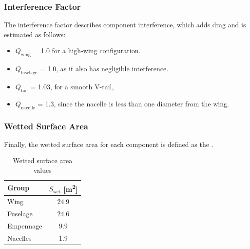 \subsubsection{Interference Factor}
The interference factor describes component interference, which adds drag and is estimated as follows:
\begin{itemize}
    \item $Q_\text{wing}$ = 1.0 for a high-wing configuration.
    \item $Q_\text{fuselage}$ = 1.0, as it also has negligible interference.
    \item $Q_\text{tail}$ = 1.03, for a smooth V-tail,
    \item $Q_\text{nacelle}$ = 1.3, since the nacelle is less than one diameter from the wing.
\end{itemize}
 
\subsubsection{Wetted Surface Area}
Finally, the wetted surface area for each component is defined as the .

\begin{table}[H]
    \centering
    \caption{Wetted surface area values}
    \label{tab:Wetted Surface Area}
    \begin{tabular}{l|S[table-format=2.1]}
        \toprule
        \textbf{Group}       & \textbf{$S_\text{wet}$} [\unit{m^2}]      \\ \midrule
        Wing        & 24.9             \\
        Fuselage    & 24.6             \\
        Empennage   & 9.9             \\
        Nacelles    & 1.9             \\
        \bottomrule
    \end{tabular}
\end{table}


 
